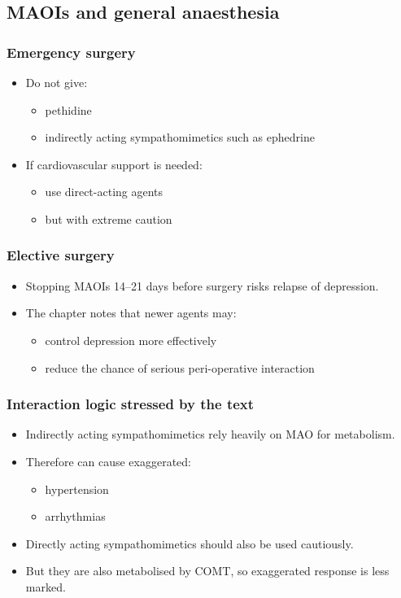 \documentclass[11pt,a4paper]{article}
\begin{document}
\subsection{MAOIs and general anaesthesia}

\subsubsection{Emergency surgery}
\begin{itemize}
  \item Do not give:
  \begin{itemize}
    \item pethidine
    \item indirectly acting sympathomimetics such as ephedrine
  \end{itemize}
  \item If cardiovascular support is needed:
  \begin{itemize}
    \item use direct-acting agents
    \item but with extreme caution
  \end{itemize}
\end{itemize}

\subsubsection{Elective surgery}
\begin{itemize}
  \item Stopping MAOIs 14--21 days before surgery risks relapse of depression.
  \item The chapter notes that newer agents may:
  \begin{itemize}
    \item control depression more effectively
    \item reduce the chance of serious peri-operative interaction
  \end{itemize}
\end{itemize}

\subsubsection{Interaction logic stressed by the text}
\begin{itemize}
  \item Indirectly acting sympathomimetics rely heavily on MAO for metabolism.
  \item Therefore can cause exaggerated:
  \begin{itemize}
    \item hypertension
    \item arrhythmias
  \end{itemize}
  \item Directly acting sympathomimetics should also be used cautiously.
  \item But they are also metabolised by COMT, so exaggerated response is less marked.
\end{itemize}
\end{document}
